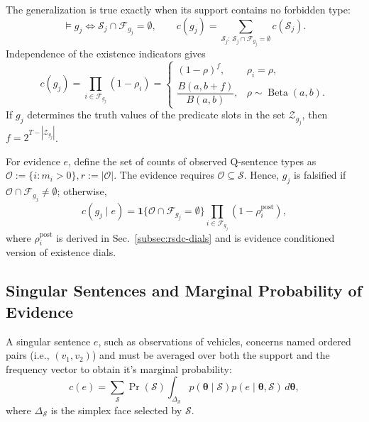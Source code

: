 \documentclass[10pt, conference, letterpaper]{ IEEEtran}
\theoremstyle{bfnote}
\begin{document}
The generalization is true exactly when its support contains no forbidden
type:
\begin{equation}
\label{eq:rsdc-genmaster}
\models g_j
\iff
\mathcal{S}_j\cap\mathcal{F}_{g_j}=\emptyset,
\qquad
c(g_j)
=
\sum_{\mathcal{S}_j:\,
\mathcal{S}_j\cap\mathcal{F}_{g_j}=\emptyset}
c(\mathcal{S}_j).
\end{equation}
Independence of the existence indicators gives
\begin{equation}
\label{eq:rsdc-genprior}
c(g_j)
=
\prod_{i\in\mathcal{F}_{g_j}}(1-\rho_i)
=
\begin{cases}
(1-\rho)^f, & \rho_i=\rho,\\[3pt]
\dfrac{B(a,b+f)}{B(a,b)},
& \rho\sim\operatorname{Beta}(a,b).
\end{cases}
\end{equation}
If $g_j$ determines the truth values of the predicate slots in the set $\mathcal{Z}_{g_j}$, then
$f=2^{T-|\mathcal{Z}_{g_j}|}$.

For evidence $e$, define the set of counts of observed Q-sentence types as
$
    \mathcal{O}:=\{i:m_i>0\},
    r:=|\mathcal{O}|.
$
The evidence requires $\mathcal{O}\subseteq\mathcal{S}$. Hence, $g_j$ is
falsified if $\mathcal{O}\cap\mathcal{F}_{g_j}\neq\emptyset$; otherwise,
\begin{equation}
\label{eq:rsdc-genpost}
c(g_j\mid e)
=
\mathbf{1}\{\mathcal{O}\cap\mathcal{F}_{g_j}=\emptyset\}
\prod_{i\in\mathcal{F}_{g_j}}
\left(1-\rho_i^{\mathrm{post}}\right),
\end{equation}
where $\rho_i^{\mathrm{post}}$ is derived in
Sec.~\ref{subsec:rsdc-dials} and is evidence conditioned version of existence dials.

\subsection{Singular Sentences and Marginal Probability of Evidence}
\label{subsec:rsdc-marginal}

A singular sentence $e$, such as observations of vehicles, concerns named ordered pairs (i.e., $(v_1, v_2)$) and must be averaged over
both the support and the frequency vector to obtain it's marginal probability:
\begin{equation}
\label{eq:rsdc-triple}
c(e)
=
\sum_{\mathcal{S}}
\Pr(\mathcal{S})
\int_{\Delta_{\mathcal{S}}}
p(\boldsymbol{\theta}\mid\mathcal{S})
p(e\mid\boldsymbol{\theta},\mathcal{S})
\,d\boldsymbol{\theta},
\end{equation}
where $\Delta_{\mathcal{S}}$ is the simplex face selected by
$\mathcal{S}$.
\end{document}
